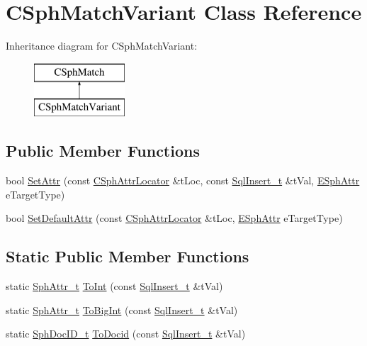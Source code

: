 \hypertarget{classCSphMatchVariant}{\section{C\-Sph\-Match\-Variant Class Reference}
\label{classCSphMatchVariant}
}
Inheritance diagram for C\-Sph\-Match\-Variant\-:\begin{figure}[H]
\begin{center}
\leavevmode
\includegraphics[height=2.000000cm]{classCSphMatchVariant}
\end{center}
\end{figure}
\subsection*{Public Member Functions}
\begin{DoxyCompactItemize}
\item 
bool \hyperlink{classCSphMatchVariant_a3b2cd5a784d5aa4fdce3b5c4792a48bd}{Set\-Attr} (const \hyperlink{structCSphAttrLocator}{C\-Sph\-Attr\-Locator} \&t\-Loc, const \hyperlink{structSqlInsert__t}{Sql\-Insert\-\_\-t} \&t\-Val, \hyperlink{sphinxexpr_8h_aa883df0db2e4468a107fdd2d2ae625a3}{E\-Sph\-Attr} e\-Target\-Type)
\item 
bool \hyperlink{classCSphMatchVariant_a73b1bc25647f26d158e1f69e250e1616}{Set\-Default\-Attr} (const \hyperlink{structCSphAttrLocator}{C\-Sph\-Attr\-Locator} \&t\-Loc, \hyperlink{sphinxexpr_8h_aa883df0db2e4468a107fdd2d2ae625a3}{E\-Sph\-Attr} e\-Target\-Type)
\end{DoxyCompactItemize}
\subsection*{Static Public Member Functions}
\begin{DoxyCompactItemize}
\item 
static \hyperlink{sphinx_8h_a7c122d91b0b52a0214ba176636bb1561}{Sph\-Attr\-\_\-t} \hyperlink{classCSphMatchVariant_a68912f2359e675031333680e53ff114a}{To\-Int} (const \hyperlink{structSqlInsert__t}{Sql\-Insert\-\_\-t} \&t\-Val)
\item 
static \hyperlink{sphinx_8h_a7c122d91b0b52a0214ba176636bb1561}{Sph\-Attr\-\_\-t} \hyperlink{classCSphMatchVariant_a19ced5d8558fd99d3b6ca1f53ac3675b}{To\-Big\-Int} (const \hyperlink{structSqlInsert__t}{Sql\-Insert\-\_\-t} \&t\-Val)
\item 
static \hyperlink{sphinx_8h_a3176771631c12a9e4897272003e6b447}{Sph\-Doc\-I\-D\-\_\-t} \hyperlink{classCSphMatchVariant_a2be42bb6f40ab9aaae512900bbcf59e0}{To\-Docid} (const \hyperlink{structSqlInsert__t}{Sql\-Insert\-\_\-t} \&t\-Val)
\end{DoxyCompactItemize}
